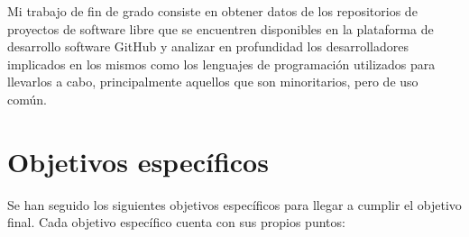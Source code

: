 \documentclass[a4paper, 12pt]{book}
\begin{document}


Mi trabajo de fin de grado consiste en obtener datos de los repositorios de proyectos de software libre que se encuentren disponibles en la plataforma de desarrollo software GitHub y analizar en profundidad los desarrolladores implicados en los mismos como los lenguajes de programación utilizados para llevarlos a cabo, principalmente aquellos que son minoritarios, pero de uso común.

\section{Objetivos específicos}
\label{sec:objetivos-especificos}

Se han seguido los siguientes objetivos específicos para llegar a cumplir el objetivo final. Cada objetivo específico cuenta con sus propios puntos:
\end{document}
